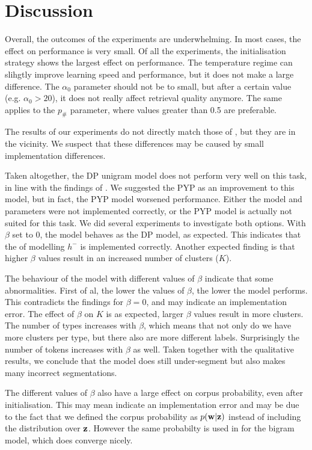 \section{Discussion}

Overall, the outcomes of the experiments are underwhelming. In most cases, the effect on performance is very small. Of all the experiments, the initialisation strategy shows the largest effect on performance. The temperature regime can slihgtly improve learning speed and performance, but it does not make a large difference. The $\alpha_0$ parameter should not be to small, but after a certain value (e.g. $\alpha_0 > 20$), it does not really affect retrieval quality anymore. The same applies to the $p_\#$ parameter, where values greater than 0.5 are preferable.

The results of our experiments do not directly match those of \cite{Goldwater200921}, but they are in the vicinity. We suspect that these differences may be caused by small implementation differences.

Taken altogether, the DP unigram model does not perform very well on this task, in line with the findings of  \cite{Goldwater200921}. We suggested the PYP as an improvement to this model, but in fact, the PYP model worsened performance. Either the model and parameters were not implemented correctly, or the PYP model is actually not suited for this task. We did several experiments to investigate both options. With $\beta$ set to 0, the model behaves as the DP model, as expected. This indicates that the of modelling $h^-$ is implemented correctly. Another expected finding is that higher $\beta$ values result in an increased number of clusters ($K$). 

The behaviour of the model with different values of $\beta$ indicate that some abnormalities. First of al, the lower the values of $\beta$, the lower the model performs. This contradicts the findings for $\beta = 0$, and may indicate an implementation error. The effect of $\beta$ on $K$ is as expected, larger $\beta$ values result in more clusters.
The number of types increases with $\beta$, which means that not only do we have more clusters per type, but there also are more different labels. Surprisingly the number of tokens increases with $\beta$ as well. Taken together with the qualitative results, we conclude that the model does still under-segment but also makes many incorrect segmentations.

The different values of $\beta$ also have a large effect on corpus probability, even after initialisation. This may mean indicate an implementation error and may be due to the fact that we defined the corpus probability as $p(\bm{\mathbf{w}}|\bm{\mathbf{z}})$ instead of including the distribution over $\bm{\mathbf{z}}$. However the same probabilty is used in \cite{Goldwater200921} for the bigram model, which does converge nicely.
 
